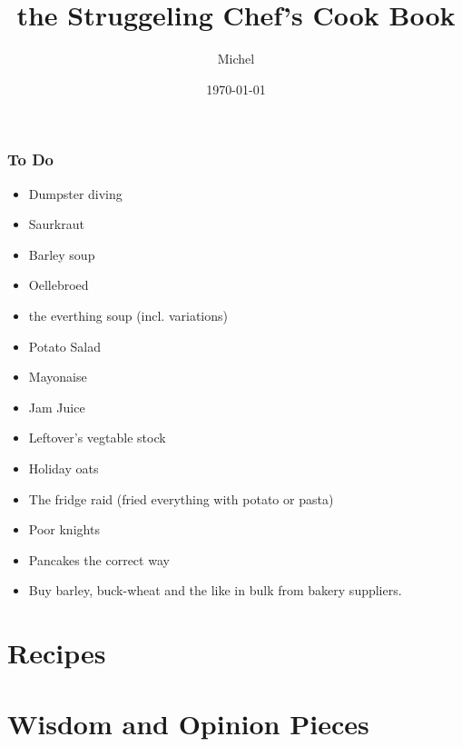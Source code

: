 \documentclass[12pt]{article}
\title{\sc the Struggeling Chef's Cook Book}
\author{Michel}
\date{\today}
\begin{document}
\maketitle

\tableofcontents

\section*{To Do}{
  \begin{itemize}
    \item Dumpster diving
    \item Saurkraut
    \item Barley soup
    \item Oellebroed
    \item the everthing soup (incl. variations)
    \item Potato Salad
    \item Mayonaise
    \item Jam Juice
    \item Leftover's vegtable stock
    \item Holiday oats
    \item The fridge raid (fried everything with potato or pasta)
    \item Poor knights
    \item Pancakes the correct way
    \item Buy barley, buck-wheat and the like in bulk from bakery suppliers.
  \end{itemize}

}

\clearpage
\part{\sc Recipes}\clearpage


\part{\sc Wisdom and Opinion Pieces}
\clearpage

\end{document}
